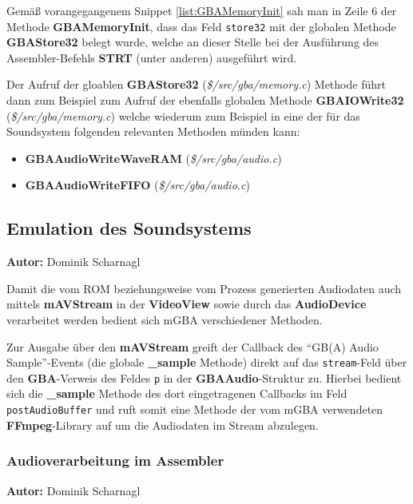 \documentclass[11pt,a4paper]{scrartcl}
\newcommand{\AutorDominik} {
    \vspace{-4mm}
    \large \textbf{Autor:} Dominik Scharnagl \normalsize
    \vspace{2mm}
}
\begin{document}
Gem\"a{\ss} vorangegangenem Snippet \ref{list:GBAMemoryInit} sah man in Zeile 6 der Methode \textbf{GBAMemoryInit}, dass das Feld \verb|store32| mit der globalen Methode \textbf{GBAStore32} belegt wurde, welche an dieser Stelle bei der Ausf\"uhrung des Assembler-Befehls \textbf{STRT} (unter anderen) ausgef\"uhrt wird.

Der Aufruf der gloablen \textbf{GBAStore32} (\textit{\$/src/gba/memory.c}) Methode f\"uhrt dann zum Beispiel zum Aufruf der ebenfalls globalen Methode \textbf{GBAIOWrite32} (\textit{\$/src/gba/memory.c}) welche wiederum zum Beispiel in eine der f\"ur das Soundsystem folgenden relevanten Methoden m\"unden kann:

\begin{itemize}
    \item \textbf{GBAAudioWriteWaveRAM} (\textit{\$/src/gba/audio.c})
    \item \textbf{GBAAudioWriteFIFO} (\textit{\$/src/gba/audio.c})
\end{itemize}



\subsection{Emulation des Soundsystems} \label{EmulationSoundsystem}
\AutorDominik

Damit die vom ROM beziehungsweise vom Prozess generierten Audiodaten auch mittels \textbf{mAVStream} in der \textbf{VideoView} sowie durch das \textbf{AudioDevice} verarbeitet werden bedient sich mGBA verschiedener Methoden.

Zur Ausgabe \"uber den \textbf{mAVStream} greift der Callback des \enquote{GB(A) Audio Sample}-Events (die globale \textbf{{\_}sample} Methode) direkt auf das \verb|stream|-Feld \"uber den \textbf{GBA}-Verweis des Feldes \verb|p| in der \textbf{GBAAudio}-Struktur zu. Hierbei bedient sich die \textbf{{\_}sample} Methode des dort eingetragenen Callbacks im Feld \verb|postAudioBuffer| und ruft somit eine Methode der vom mGBA verwendeten \textbf{FFmpeg}-Library auf um die Audiodaten im Stream abzulegen.



\subsubsection{Audioverarbeitung im Assembler}
\AutorDominik

\end{document}
